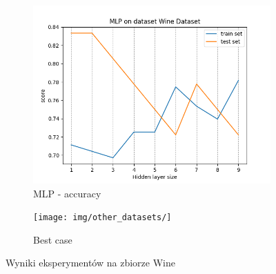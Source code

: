\documentclass[12pt]{article}
\newcommand*{\subfigwidth}{0.24\textwidth}
\begin{document}
\begin{figure}[H]
\begin{subfigure}[t]{\subfigwidth}
        \includegraphics[width=\linewidth]{img/other_datasets/mlp/wine_accuracy.png}
        \caption{MLP - accuracy}
    \end{subfigure}
    \hfill
    \begin{subfigure}[t]{\subfigwidth}
        \texttt{[image: img/other\_datasets/]}
        \caption{Best case}
    \end{subfigure}
    \caption{Wyniki eksperymentów na zbiorze Wine}
\end{figure}
\end{document}
